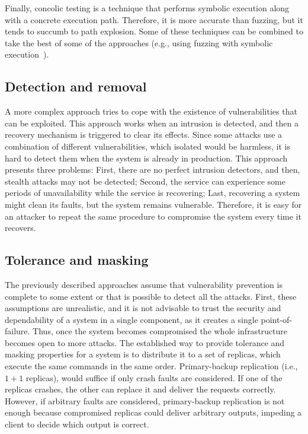 Finally, concolic testing is a technique that performs symbolic execution along with a concrete execution path. 
Therefore, it is more accurate than fuzzing, but it tends to succumb to path explosion.
Some of these techniques can be combined to take the best of some of the approaches (e.g., using fuzzing with symbolic execution~\cite{Stephens:2016}).


\subsection*{Detection and removal}
A more complex approach tries to cope with the existence of vulnerabilities that can be exploited.
This approach works when an intrusion is detected, and then a recovery mechanism is triggered to clear its effects. 
Since some attacks use a combination of different vulnerabilities, which isolated would be harmless, it is hard to detect them when the system is already in production. 
This approach presents three problems: 
First, there are no perfect intrusion detectors, and then, stealth attacks may not be detected; 
Second, the service can experience some periods of unavailability while the service is recovering; 
Last, recovering a system might clean its faults, but the system remains vulnerable.
Therefore, it is easy for an attacker to repeat the same procedure to compromise the system every time it recovers.


\subsection*{Tolerance and masking}
The previously described approaches assume that vulnerability prevention is complete to some extent or that is possible to detect all the attacks.
First, these assumptions are unrealistic, and it is not advisable to trust the security and dependability of a system in a single component, as it creates a single point-of-failure. 
Thus, once the system becomes compromised the whole infrastructure becomes open to more attacks. 
The established way to provide tolerance and masking properties for a system is to distribute it to a set of replicas, which execute the same commands in the same order. 
Primary-backup replication (i.e., $1 + 1$ replicas), would suffice if only crash faults are considered. 
If one of the replicas crashes, the other can replace it and deliver the requests correctly.
However, if arbitrary faults are considered, primary-backup replication is not enough because compromised replicas could deliver arbitrary outputs, impeding a client to decide which output is correct.


